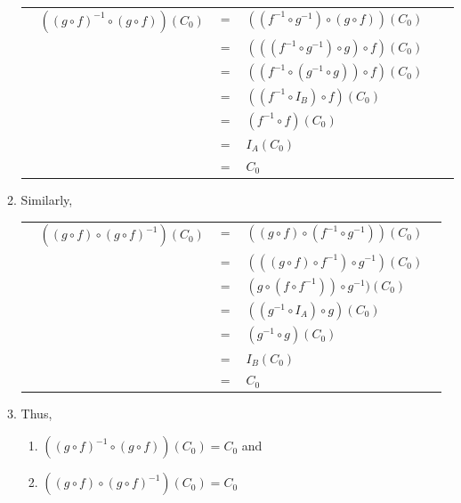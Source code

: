 \documentclass[12pt]{article}
\begin{document}
\begin{itemize}
\begin{enumerate}
\begin{table}[H]
    \begin{tabular}{p{1.4cm}lclll}	
    & $( (g \circ f)^{-1} \circ (g \circ f)) (C_0)$ & $=$ & $ ((f^{-1} \circ g^{-1}) \circ (g \circ f) ) (C_0)  $ &  \\
    & & $=$ & $ (((f^{-1} \circ g^{-1}) \circ g) \circ f)  (C_0)  $ & \\
    & & $=$ & $ ((f^{-1} \circ (g^{-1} \circ g)) \circ f)  (C_0)  $ & \\
    & & $=$ & $ ((f^{-1} \circ I_B) \circ f)  (C_0)  $ & \\
    & & $=$ & $ (f^{-1} \circ  f)  (C_0)  $ & \\
    & & $=$ & $ I_A (C_0)  $ & \\
    & & $=$ & $ C_0  $ & \\
    \end{tabular}
\end{table}
\item Similarly,
\begin{table}[H]
    \begin{tabular}{p{1.4cm}ccll}	
    & $( (g \circ f) \circ (g \circ f)^{-1}) (C_0)$ & $=$ & $ ( (g \circ f) \circ (f^{-1} \circ g^{-1}) ) (C_0)  $ &  \\
    & & $=$ & $ (((g \circ f) \circ f^{-1}) \circ g^{-1})  (C_0)  $ & \\
    & & $=$ & $ (g \circ (f \circ f^{-1})) \circ g^{-1})  (C_0)  $ & \\
    & & $=$ & $ ((g^{-1} \circ I_A) \circ g)  (C_0)  $ & \\
    & & $=$ & $ (g^{-1} \circ  g)  (C_0)  $ & \\
    & & $=$ & $ I_B (C_0)  $ & \\
    & & $=$ & $ C_0  $ & \\
    \end{tabular}
\end{table}
\item
Thus,
\begin{enumerate}
    \item $( (g \circ f)^{-1} \circ (g \circ f)) (C_0) = C_0$ and
    \item $( (g \circ f) \circ (g \circ f)^{-1}) (C_0) = C_0$
\end{enumerate} 


\end{enumerate}
\end{itemize}
\end{document}
